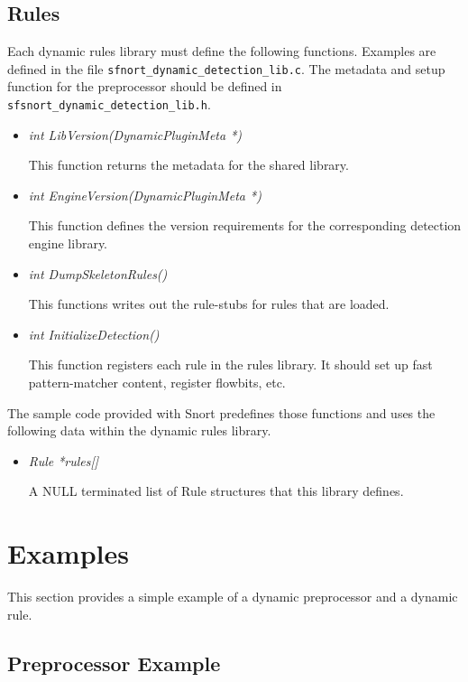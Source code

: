 \documentclass[english]{report}
\begin{document}
\subsection{Rules}

Each dynamic rules library must define the following functions.  Examples are
defined in the file \texttt{sfnort\_dynamic\_detection\_lib.c}.  The metadata
and setup function for the preprocessor should be defined in
\texttt{sfsnort\_dynamic\_detection\_lib.h}.

\begin{itemize}
\item {\em int LibVersion(DynamicPluginMeta *)}

This function returns the metadata for the shared library.

\item {\em int EngineVersion(DynamicPluginMeta *)}

This function defines the version requirements for the corresponding detection
engine library.

\item {\em int DumpSkeletonRules()}

This functions writes out the rule-stubs for rules that are loaded.

\item {\em int InitializeDetection()}

This function registers each rule in the rules library.  It should set up fast
pattern-matcher content, register flowbits, etc.  \end{itemize}

The sample code provided with Snort predefines those functions and uses the
following data within the dynamic rules library.

\begin{itemize}

\item {\em Rule *rules[]}

A NULL terminated list of Rule structures that this library defines.

\end{itemize}

\section{Examples}

This section provides a simple example of a dynamic preprocessor and a dynamic
rule.

\subsection{Preprocessor Example}
\end{document}
